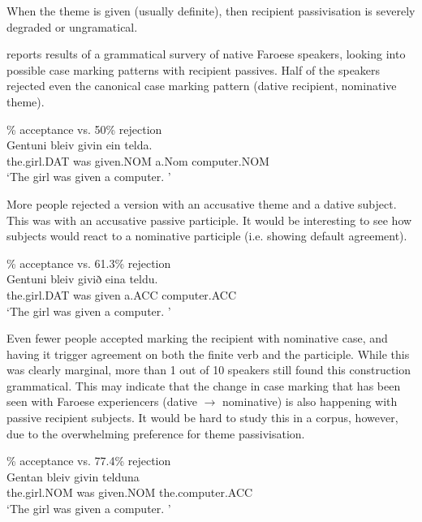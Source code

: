 When the theme is given (usually definite), then recipient passivisation is severely degraded or ungramatical.
\begin{exe}
\ex 
\begin{xlist}
\end{xlist}
\end{exe}
\cite{Eyorsson.2012} reports results of a grammatical survery of native Faroese speakers, looking into possible case marking patterns with recipient passives. Half of the speakers rejected even the canonical case marking pattern (dative recipient, nominative theme).
\begin{exe}
\% acceptance vs. 50\% rejection\\
\gll Gentuni bleiv givin ein telda.\\
the.girl.DAT was given.NOM a.Nom computer.NOM\\
\trans `The girl was given a computer. \cite[ex 45a]{Eyorsson.2012}'
\end{exe}
More people rejected a version with an accusative theme and a dative subject. This was with an accusative passive participle. It would be interesting to see how subjects would react to a nominative participle (i.e. showing default agreement).
\begin{exe}
\% acceptance vs. 61.3\% rejection\\
\gll Gentuni bleiv givið eina teldu.\\
the.girl.DAT was given a.ACC computer.ACC\\
\trans `The girl was given a computer. \cite[ex 45b]{Eyorsson.2012}'
\end{exe}
Even fewer people accepted marking the recipient with nominative case, and having it trigger agreement on both the finite verb and the participle. While this was clearly marginal, more than 1 out of 10 speakers still found this construction grammatical.  This may indicate that the change in case marking that has been seen with Faroese experiencers (dative $\rightarrow$ nominative) is also happening with passive recipient subjects. It would be hard to study this in a corpus, however, due to the overwhelming preference for theme passivisation.
\begin{exe}
\% acceptance vs. 77.4\% rejection\\
\gll Gentan bleiv givin telduna\\
the.girl.NOM was given.NOM the.computer.ACC\\
\trans `The girl was given a computer. \cite[ex 48b]{Eyorsson.2012}'
\end{exe}

